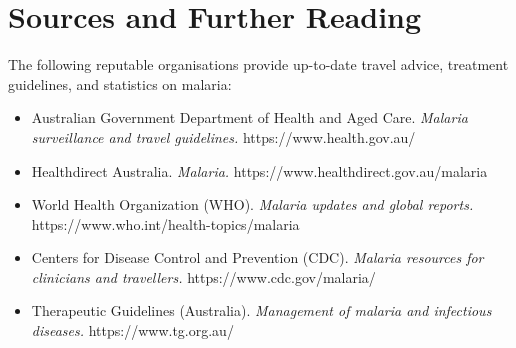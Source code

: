 \section*{Sources and Further Reading}
The following reputable organisations provide up-to-date travel advice, treatment guidelines, and statistics on malaria:
\begin{itemize}
    \item Australian Government Department of Health and Aged Care. \textit{Malaria surveillance and travel guidelines.} https://www.health.gov.au/
    \item Healthdirect Australia. \textit{Malaria.} https://www.healthdirect.gov.au/malaria
    \item World Health Organization (WHO). \textit{Malaria updates and global reports.} https://www.who.int/health-topics/malaria
    \item Centers for Disease Control and Prevention (CDC). \textit{Malaria resources for clinicians and travellers.} https://www.cdc.gov/malaria/
    \item Therapeutic Guidelines (Australia). \textit{Management of malaria and infectious diseases.} https://www.tg.org.au/
\end{itemize}
